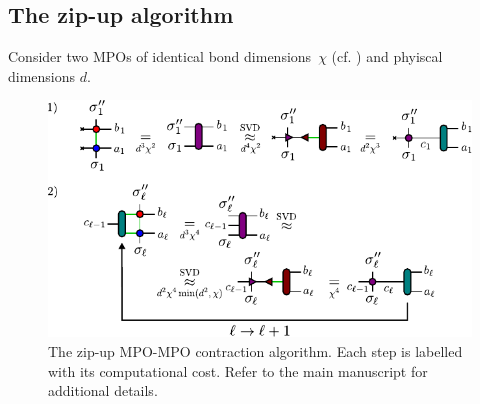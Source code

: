 \subsection{The zip-up algorithm}
Consider two MPOs of identical bond dimensions~\(\chi\) (cf. ) and phyiscal dimensions $d$. 
\begin{figure}[ht!]
    \centering
    \includegraphics{figures/ZipUp.pdf}
    \caption{The zip-up MPO-MPO contraction algorithm. Each step is labelled with its computational cost. Refer to the main manuscript for additional details.}
    \label{fig:zipupalg}
\end{figure}

